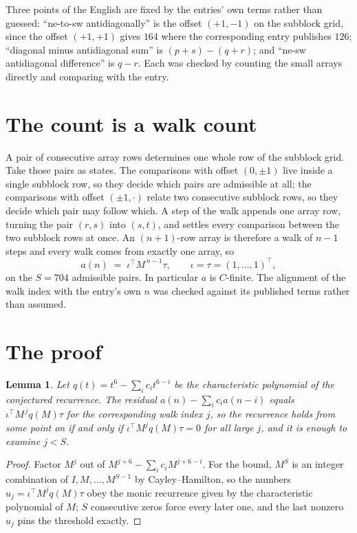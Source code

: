 \documentclass[11pt,a4paper]{article}
\theoremstyle{plain}
\newtheorem{lemma}[theorem]{Lemma}
\theoremstyle{definition}
\begin{document}
Three points of the English are fixed by the entries' own terms rather than guessed:
``ne-to-sw antidiagonally'' is the offset $(+1,-1)$ on the subblock grid, since the offset
$(+1,+1)$ gives $164$ where the corresponding entry publishes $126$; ``diagonal minus
antidiagonal sum'' is $(p+s)-(q+r)$; and ``ne-sw antidiagonal difference'' is $q-r$. Each was
checked by counting the small arrays directly and comparing with the entry.

\section{The count is a walk count}

A pair of consecutive array rows determines one whole row of the subblock grid. Take those
pairs as states. The comparisons with offset $(0,\pm1)$ live inside a single subblock row, so
they decide which pairs are admissible at all; the comparisons with offset $(\pm1,\cdot)$
relate two consecutive subblock rows, so they decide which pair may follow which. A step of the
walk appends one array row, turning the pair $(r,s)$ into $(s,t)$, and settles every comparison
between the two subblock rows at once. An $(n+1)$-row array is therefore a walk of $n-1$ steps
and every walk comes from exactly one array, so
\[
a(n)\;=\;\iota^{\!\top}M^{\,n-1}\tau,\qquad \iota=\tau=(1,\dots,1)^{\!\top},
\]
on the $S=704$ admissible pairs. In particular $a$ is $C$-finite. The alignment of the walk
index with the entry's own $n$ was checked against its published terms rather than assumed.

\section{The proof}

\begin{lemma}\label{lem:crit}
Let $q(t)=t^{6}-\sum_i c_it^{6-i}$ be the characteristic polynomial of the
conjectured recurrence. The residual $a(n)-\sum_ic_ia(n-i)$ equals
$\iota^{\!\top}M^{\,j}q(M)\tau$ for the corresponding walk index $j$, so the recurrence
holds from some point on if and only if $\iota^{\!\top}M^{j}q(M)\tau=0$ for all large $j$,
and it is enough to examine $j<S$.
\end{lemma}

\begin{proof}
Factor $M^{j}$ out of $M^{j+6}-\sum_ic_iM^{j+6-i}$. For the bound, $M^{S}$
is an integer combination of $I,M,\dots,M^{S-1}$ by Cayley--Hamilton, so the numbers
$u_j=\iota^{\!\top}M^{j}q(M)\tau$ obey the monic recurrence given by the characteristic
polynomial of $M$; $S$ consecutive zeros force every later one, and the last nonzero $u_j$
pins the threshold exactly.
\end{proof}
\end{document}
